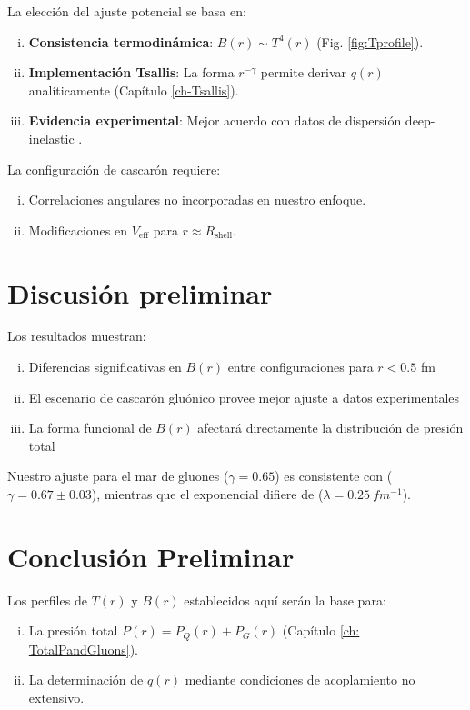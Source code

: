 
\begin{remark}
    La elección del ajuste potencial se basa en:
    \begin{enumerate}[i.]
        \item \textbf{Consistencia termodinámica}: $B(r) \sim T^4(r)$ (Fig. \ref{fig:Tprofile}).
        \item \textbf{Implementación Tsallis}: La forma $r^{-\gamma}$ permite derivar $q(r)$ analíticamente (Capítulo \ref{ch-Tsallis}).
        \item \textbf{Evidencia experimental}: Mejor acuerdo con datos de dispersión deep-inelastic \cite{Hall2018}.
    \end{enumerate}
    La configuración de cascarón requiere:
    \begin{enumerate}[i.]
        \item Correlaciones angulares no incorporadas en nuestro enfoque.
        \item Modificaciones en $V_{\text{eff}}$ para $r \approx R_{\text{shell}}$.
    \end{enumerate}
\end{remark}

\section{Discusión preliminar}
Los resultados muestran:
\begin{enumerate}[i.]
    \item Diferencias significativas en $B(r)$ entre configuraciones para $r < 0.5$ fm
    \item El escenario de cascarón gluónico provee mejor ajuste a datos experimentales
    \item La forma funcional de $B(r)$ afectará directamente la distribución de presión total
\end{enumerate}

Nuestro ajuste para el mar de gluones ($\gamma=0.65$) es consistente con \cite{Burkert2020} ($\gamma=0.67 \pm 0.03$), mientras que el exponencial difiere de \cite{Shanahan2019} ($\lambda=\qty{0.25}{fm^{-1}}$).

\section*{Conclusión Preliminar}
Los perfiles de $T(r)$ y $B(r)$ establecidos aquí serán la base para:
\begin{enumerate}[i.]
    \item La presión total $P(r) = P_Q(r) + P_G(r)$ (Capítulo \ref{ch: TotalPandGluons}).
    \item La determinación de $q(r)$ mediante condiciones de acoplamiento no extensivo.
\end{enumerate}